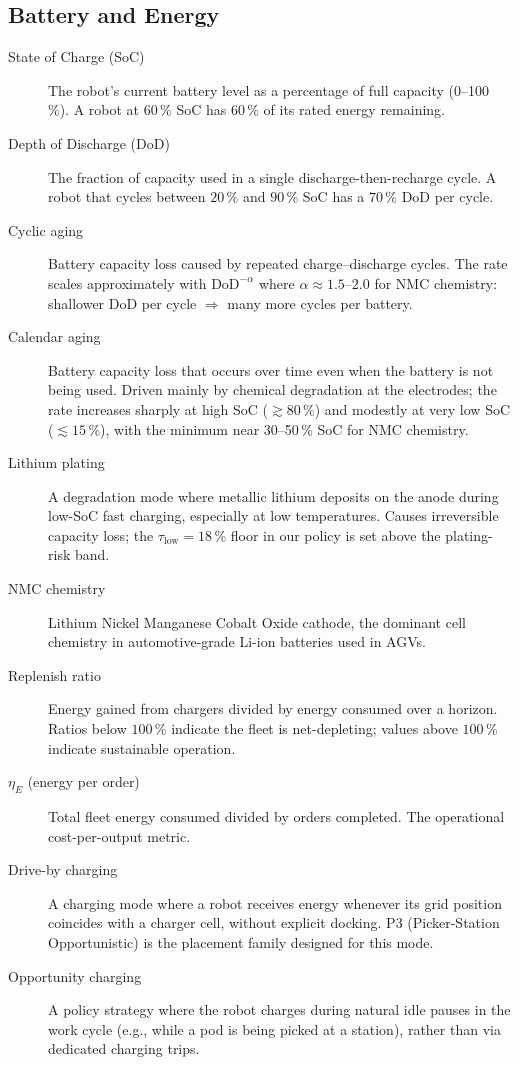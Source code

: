 \documentclass[conference]{IEEEtran}
\begin{document}
\subsection*{Battery and Energy}
\begin{description}
  \item[State of Charge (SoC)] The robot's current battery level as a percentage of full capacity (0--100\,\%). A robot at $60\,\%$ SoC has $60\,\%$ of its rated energy remaining.
  \item[Depth of Discharge (DoD)] The fraction of capacity used in a single discharge-then-recharge cycle. A robot that cycles between $20\,\%$ and $90\,\%$ SoC has a $70\,\%$ DoD per cycle.
  \item[Cyclic aging] Battery capacity loss caused by repeated charge--discharge cycles. The rate scales approximately with $\text{DoD}^{-\alpha}$ where $\alpha \approx 1.5\text{--}2.0$ for NMC chemistry: shallower DoD per cycle $\Rightarrow$ many more cycles per battery.
  \item[Calendar aging] Battery capacity loss that occurs over time even when the battery is not being used. Driven mainly by chemical degradation at the electrodes; the rate increases sharply at high SoC ($\gtrsim 80\,\%$) and modestly at very low SoC ($\lesssim 15\,\%$), with the minimum near 30--50\,\% SoC for NMC chemistry.
  \item[Lithium plating] A degradation mode where metallic lithium deposits on the anode during low-SoC fast charging, especially at low temperatures. Causes irreversible capacity loss; the $\tau_\text{low} = 18\,\%$ floor in our policy is set above the plating-risk band.
  \item[NMC chemistry] Lithium Nickel Manganese Cobalt Oxide cathode, the dominant cell chemistry in automotive-grade Li-ion batteries used in AGVs.
  \item[Replenish ratio] Energy gained from chargers divided by energy consumed over a horizon. Ratios below $100\,\%$ indicate the fleet is net-depleting; values above $100\,\%$ indicate sustainable operation.
  \item[$\eta_E$ (energy per order)] Total fleet energy consumed divided by orders completed. The operational cost-per-output metric.
  \item[Drive-by charging] A charging mode where a robot receives energy whenever its grid position coincides with a charger cell, without explicit docking. P3 (Picker-Station Opportunistic) is the placement family designed for this mode.
  \item[Opportunity charging] A policy strategy where the robot charges during natural idle pauses in the work cycle (e.g., while a pod is being picked at a station), rather than via dedicated charging trips.
\end{description}
\end{document}
